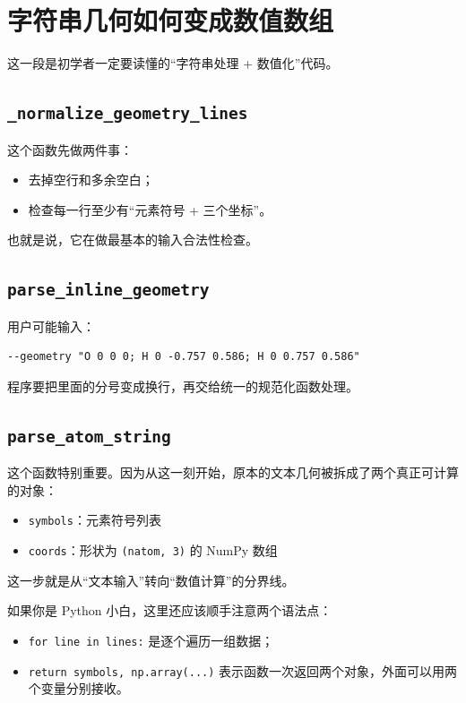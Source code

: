 \documentclass[UTF8,11pt,fontset=fandol]{ctexbook}
\begin{document}
\section{字符串几何如何变成数值数组}



这一段是初学者一定要读懂的“字符串处理 + 数值化”代码。

\subsection*{\texttt{\_normalize\_geometry\_lines}}

这个函数先做两件事：
\begin{itemize}
  \item 去掉空行和多余空白；
  \item 检查每一行至少有“元素符号 + 三个坐标”。
\end{itemize}

也就是说，它在做最基本的输入合法性检查。

\subsection*{\texttt{parse\_inline\_geometry}}

用户可能输入：
\begin{lstlisting}[style=bashstyle]
--geometry "O 0 0 0; H 0 -0.757 0.586; H 0 0.757 0.586"
\end{lstlisting}

程序要把里面的分号变成换行，再交给统一的规范化函数处理。

\subsection*{\texttt{parse\_atom\_string}}

这个函数特别重要。因为从这一刻开始，原本的文本几何被拆成了两个真正可计算的对象：
\begin{itemize}
  \item \texttt{symbols}：元素符号列表
  \item \texttt{coords}：形状为 \texttt{(natom, 3)} 的 NumPy 数组
\end{itemize}

这一步就是从“文本输入”转向“数值计算”的分界线。

如果你是 Python 小白，这里还应该顺手注意两个语法点：
\begin{itemize}
  \item \texttt{for line in lines:} 是逐个遍历一组数据；
  \item \texttt{return symbols, np.array(...)} 表示函数一次返回两个对象，外面可以用两个变量分别接收。
\end{itemize}
\end{document}
